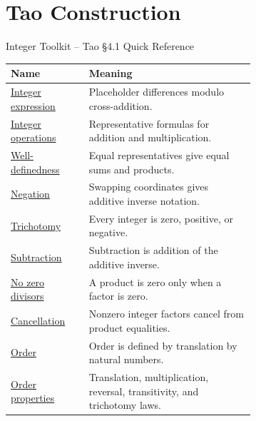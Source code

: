 \section{Tao Construction}

\begin{toolkitbox}{Integer Toolkit -- Tao \S4.1 Quick Reference}
\small
\begin{tabular}{l p{0.68\linewidth}}
\toprule
\textbf{Name} & \textbf{Meaning} \\
\midrule
\hyperref[def:tao-integer-expression]{Integer expression} & Placeholder differences modulo cross-addition. \\
\hyperref[def:tao-integer-operations]{Integer operations} & Representative formulas for addition and multiplication. \\
\hyperref[lem:int-well-defined]{Well-definedness} & Equal representatives give equal sums and products. \\
\hyperref[def:tao-negation]{Negation} & Swapping coordinates gives additive inverse notation. \\
\hyperref[lem:int-trichotomy]{Trichotomy} & Every integer is zero, positive, or negative. \\
\hyperref[def:int-subtraction]{Subtraction} & Subtraction is addition of the additive inverse. \\
\hyperref[prop:int-no-zero-div]{No zero divisors} & A product is zero only when a factor is zero. \\
\hyperref[cor:int-cancel]{Cancellation} & Nonzero integer factors cancel from product equalities. \\
\hyperref[def:tao-order-on-z]{Order} & Order is defined by translation by natural numbers. \\
\hyperref[lem:int-order]{Order properties} & Translation, multiplication, reversal, transitivity, and trichotomy laws. \\
\bottomrule
\end{tabular}
\end{toolkitbox}


